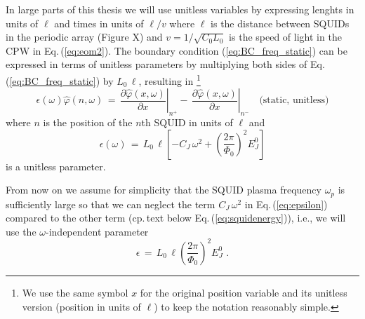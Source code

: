 In large parts of this thesis we will use unitless variables by expressing lenghts in units of $\ell$
and times in units of $\ell/v$ where $\ell$ is the distance between SQUIDs in the periodic array 
\color{red}
(Figure X)
\color{black}
and $v = 1 / \sqrt{C_0 L_0}$ is the speed of light in the CPW in Eq.\,(\ref{eq:eom2}).  
%
%
The boundary condition (\ref{eq:BC_freq_static}) can be expressed in terms of unitless parameters
by multiplying both sides of Eq.\,(\ref{eq:BC_freq_static}) by $L_0 \, \ell$, resulting in
\footnote{We use the same symbol $x$ for the original position variable and its 
unitless version (position in units of $\ell$) to keep the notation reasonably simple.}
%
\begin{equation}\label{eq:BC_freq_static_unitless}
\epsilon(\omega) \hat{\varphi}(n, \omega) \, = \, 
\left.\frac{\partial \hat{\varphi}(x, \omega)}{\partial x}\right|_{n^{+}}
- \, \left.\frac{\partial \hat{\varphi}(x,\omega)}{\partial x}\right|_{n^{-}}
\quad \text{(static, unitless)}
\end{equation}
%
where $n$ is the position of the $n$th SQUID in units of $\ell$ and 
%
\begin{equation} \label{eq:epsilon}
\epsilon(\omega) \, = \, L_0 \, \ell \left[ - C_{J} \, \omega^2 + 
\left(\frac{2 \pi}{\Phi_{0}}\right)^{2} E_J^0 \right] 
\end{equation}
%
is a unitless parameter.

From now on we assume for simplicity that the SQUID plasma frequency $\omega_p$ is sufficiently 
large so that we can neglect the term $C_{J} \, \omega^2$ in Eq.\,(\ref{eq:epsilon}) compared to 
the other term \cite{Johansson2010_DCE}
(cp.\,text below Eq.\,(\ref{eq:squidenergy})), i.e., we will use the $\omega$-independent parameter
%
\begin{equation} \label{eq:epsilon2}
\epsilon \, = \, L_0 \, \ell \left(\frac{2 \pi}{\Phi_{0}}\right)^{2} E_J^0 \, \, .
\end{equation}

